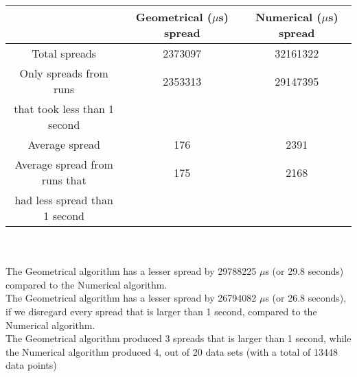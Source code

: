 \begin{tabular}[3]{c|c|c}
 & Geometrical ($\mu$s) spread & Numerical ($\mu$s) spread\\
\hline
Total spreads & 2373097 & 32161322 \\ 
\hline 
Only spreads from runs & 2353313 & 29147395 \\ 
that took less than 1 second & & \\ 
\hline
Average spread & 176 & 2391 \\
\hline
Average spread from runs that & 175 & 2168 \\ 
had less spread than 1 second & & \\ 
\end{tabular}\\ \\
The Geometrical algorithm has a lesser spread by 29788225 $\mu$s (or 29.8 seconds) compared to the Numerical algorithm.\\
The Geometrical algorithm has a lesser spread by 26794082 $\mu$s (or 26.8 seconds), if we disregard every spread that is larger than 1 second, compared to the Numerical algorithm.\\
The Geometrical algorithm produced 3 spreads that is larger than 1 second, while the Numerical algorithm produced 4, out of 20 data sets (with a total of 13448 data points)\\
